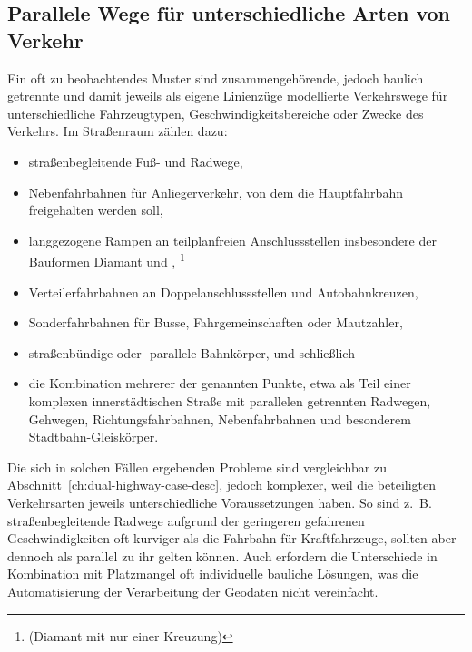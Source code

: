 \documentclass[../main/thesis.tex]{subfiles}
\begin{document}
\subsection{Parallele Wege für unterschiedliche Arten von Verkehr}
\label{ch:different-traffic-types-case-desc}

Ein oft zu beobachtendes Muster sind zusammengehörende, jedoch baulich getrennte und damit jeweils als eigene Linienzüge modellierte Verkehrswege für unterschiedliche Fahrzeugtypen, Geschwindigkeitsbereiche oder Zwecke des Verkehrs.
Im Straßenraum zählen dazu:

\begin{itemize}
	\item straßenbegleitende Fuß- und Radwege,
	\item Nebenfahrbahnen  für Anliegerverkehr, von dem die Hauptfahrbahn freigehalten werden soll,
	\item langgezogene Rampen an teilplanfreien Anschlussstellen insbesondere der Bauformen Diamant und ,%
		\footnote{ (Diamant mit nur einer Kreuzung) }
	\item Verteilerfahrbahnen an Doppelanschlussstellen und Autobahnkreuzen,
	\item Sonderfahrbahnen für Busse, Fahrgemeinschaften oder Mautzahler,
	\item straßenbündige oder -parallele Bahnkörper, und schließlich
	\item die Kombination mehrerer der genannten Punkte, etwa als Teil einer komplexen innerstädtischen Straße mit parallelen getrennten Radwegen, Gehwegen, Richtungsfahrbahnen, Nebenfahrbahnen und besonderem Stadtbahn-Gleiskörper.
\end{itemize}

Die sich in solchen Fällen ergebenden Probleme sind vergleichbar zu Abschnitt~\ref{ch:dual-highway-case-desc}, jedoch komplexer, weil die beteiligten Verkehrsarten jeweils unterschiedliche Voraussetzungen haben.
So sind z.~B. straßenbegleitende Radwege aufgrund der geringeren gefahrenen Geschwindigkeiten oft kurviger als die Fahrbahn für Kraftfahrzeuge, sollten aber dennoch als parallel zu ihr gelten können.
Auch erfordern die Unterschiede in Kombination mit Platzmangel oft individuelle bauliche Lösungen, was die Automatisierung der Verarbeitung der Geodaten nicht vereinfacht.
\end{document}
